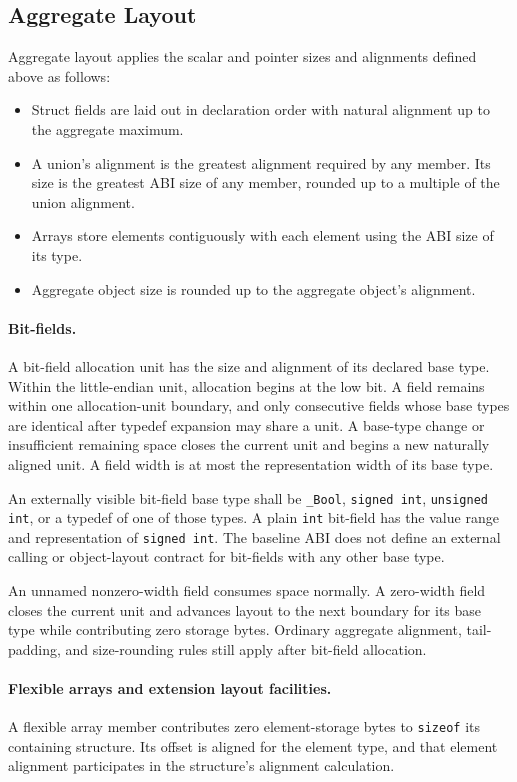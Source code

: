 \documentclass[10pt,twoside]{article}
\begin{document}
\subsection{Aggregate Layout}
Aggregate layout applies the scalar and pointer sizes and alignments defined
above as follows:
\begin{itemize}
\item Struct fields are laid out in declaration order with natural alignment up to the aggregate maximum.
\item A union's alignment is the greatest alignment required by any member. Its size is the greatest ABI size of any
member, rounded up to a multiple of the union alignment.
\item Arrays store elements contiguously with each element using the ABI size of its type.
\item Aggregate object size is rounded up to the aggregate object's alignment.
\end{itemize}

\paragraph{Bit-fields.}
A bit-field allocation unit has the size and alignment of its declared base
type. Within the little-endian unit, allocation begins at the low bit. A field
remains within one allocation-unit boundary, and only consecutive fields whose
base types are identical after typedef expansion may share a unit. A base-type
change or insufficient remaining space closes the current unit and begins a new
naturally aligned unit. A field width is at most the representation width of
its base type.

An externally visible bit-field base type shall be \texttt{\_Bool},
\texttt{signed int}, \texttt{unsigned int}, or a typedef of one of those types.
A plain \texttt{int} bit-field has the value range and representation of
\texttt{signed int}. The baseline ABI does not define an external calling or
object-layout contract for bit-fields with any other base type.

An unnamed nonzero-width field consumes space normally. A zero-width field
closes the current unit and advances layout to the next boundary for its base
type while contributing zero storage bytes. Ordinary aggregate alignment,
tail-padding, and size-rounding rules still apply after bit-field allocation.

\paragraph{Flexible arrays and extension layout facilities.}
A flexible array member contributes zero element-storage bytes to \texttt{sizeof} its
containing structure. Its offset is aligned for the element type, and that
element alignment participates in the structure's alignment calculation.
\end{document}
